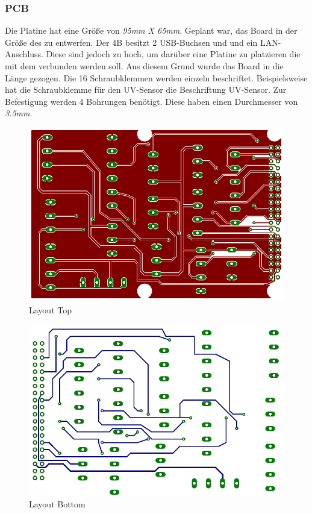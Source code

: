 \subsubsection{PCB}
Die Platine hat eine Größe von \textit{95mm X 65mm}. Geplant war, das Board in der Größe des \raspi zu entwerfen. Der \raspi 4B besitzt 2 USB-Buchsen und und ein LAN-Anschluss. Diese sind jedoch zu hoch, um darüber eine Platine zu platzieren die mit dem \raspi verbunden werden soll. Aus diesem Grund wurde das Board in die Länge gezogen. Die 16 Schraubklemmen werden einzeln beschriftet. Beispielsweise hat die Schraubklemme für den UV-Sensor die Beschriftung UV-Sensor. Zur Befestigung werden 4 Bohrungen benötigt. Diese haben einen Durchmesser von \textit{3.5mm}.\\
\vspace{3mm}
\begin{figure}[H]
	\centering
	\includegraphics[scale=0.8]{image/layouttop.png}
	\caption{Layout Top}
	\label{fig:enter-label}
\end{figure}
\begin{figure}[H]
	\centering
	\includegraphics[scale=0.8]{image/layoutbottom.png}
	\caption{Layout Bottom}
	\label{fig:enter-label}
\end{figure}
